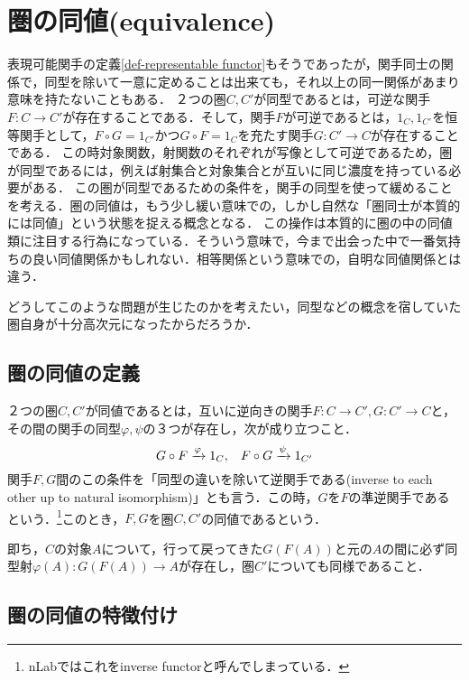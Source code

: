 \documentclass[uplatex, 12pt, dvipdfmx]{jsreport}
\begin{document}
\chapter{圏の同値(equivalence)}
表現可能関手の定義\ref{def-representable functor}もそうであったが，関手同士の関係で，同型を除いて一意に定めることは出来ても，それ以上の同一関係があまり意味を持たないこともある．
２つの圏$C,C'$が同型であるとは，可逆な関手$F:C\to C'$が存在することである．そして，関手$F$が可逆であるとは，$1_C,1_{C'}$を恒等関手として，$F\circ G=1_{C'}$かつ$G\circ F=1_C$を充たす関手$G:C'\to C$が存在することである．
この時対象関数，射関数のそれぞれが写像として可逆であるため，圏が同型であるには，例えば射集合と対象集合とが互いに同じ濃度を持っている必要がある．
この圏が同型であるための条件を，関手の同型を使って緩めることを考える．圏の同値は，もう少し緩い意味での，しかし自然な「圏同士が本質的には同値」という状態を捉える概念となる．
この操作は本質的に圏の中の同値類に注目する行為になっている．そういう意味で，今まで出会った中で一番気持ちの良い同値関係かもしれない．相等関係という意味での，自明な同値関係とは違う．

どうしてこのような問題が生じたのかを考えたい，同型などの概念を宿していた圏自身が十分高次元になったからだろうか．

\section{圏の同値の定義}
\begin{shadebox}\begin{definition}\rm{}
    ２つの圏$C,C'$が同値であるとは，互いに逆向きの関手$F:C\to C', G:C'\to C$と，その間の関手の同型$\varphi,\psi$の３つが存在し，次が成り立つこと．
    $$G\circ F\xrightarrow{\varphi}1_C,\hspace{3mm}F\circ G\xrightarrow{\psi}1_{C'}$$
    関手$F,G$間のこの条件を「同型の違いを除いて逆関手である(inverse to each other up to natural isomorphism)」とも言う．この時，$G$を$F$の準逆関手であるという．\footnote{nLabではこれをinverse functorと呼んでしまっている．}このとき，$F,G$を圏$C,C'$の同値であるという．
\end{definition}\end{shadebox}
即ち，$C$の対象$A$について，行って戻ってきた$G(F(A))$と元の$A$の間に必ず同型射$\varphi (A):G(F(A))\to A$が存在し，圏$C'$についても同様であること．

\section{圏の同値の特徴付け}
\end{document}
